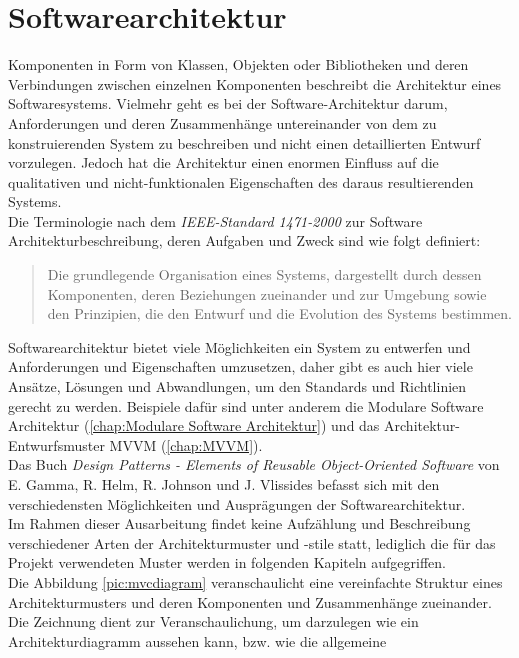 \section{Softwarearchitektur}
\label{chap:Softwarearchitektur}
Komponenten in Form von Klassen, Objekten oder Bibliotheken und deren Verbindungen zwischen einzelnen Komponenten beschreibt die Architektur 
eines Softwaresystems. Vielmehr geht es bei der Software-Architektur darum, Anforderungen und deren Zusammenhänge untereinander von dem zu 
konstruierenden System zu beschreiben und nicht einen detaillierten Entwurf vorzulegen. Jedoch hat die Architektur einen enormen Einfluss 
auf die qualitativen und nicht-funktionalen Eigenschaften des daraus resultierenden Systems. 
\\ 
\linebreak
Die Terminologie nach dem \textit{IEEE-Standard 1471-2000} zur Software Architekturbeschreibung, deren Aufgaben und Zweck \cite{swarchitekturieee.2005} 
sind wie folgt definiert: 
\begin{quote}
    Die grundlegende Organisation eines Systems, dargestellt durch dessen Komponenten, deren Beziehungen zueinander und zur Umgebung sowie den 
    Prinzipien, die den Entwurf und die Evolution des Systems bestimmen. \cite{architektursw.2006f}
\end{quote}
Softwarearchitektur bietet viele Möglichkeiten ein System zu entwerfen und Anforderungen und Eigenschaften umzusetzen, daher gibt es auch 
hier viele Ansätze, Lösungen und Abwandlungen, um den Standards und Richtlinien gerecht zu werden. Beispiele dafür sind unter anderem die 
Modulare Software Architektur (\ref{chap:Modulare Software Architektur}) und das Architektur-Entwurfsmuster MVVM (\ref{chap:MVVM}).
\\
Das Buch \textit{Design Patterns - Elements of Reusable Object-Oriented Software} von E. Gamma, R. Helm, R. Johnson und J. Vlissides befasst 
sich mit den verschiedensten Möglichkeiten und Ausprägungen der Softwarearchitektur. 
\\ 
Im Rahmen dieser Ausarbeitung findet keine Aufzählung und Beschreibung verschiedener Arten der Architekturmuster und -stile statt, lediglich die 
für das Projekt verwendeten Muster werden in folgenden Kapiteln aufgegriffen. 
\\ 
\linebreak
Die Abbildung \ref{pic:mvcdiagram} veranschaulicht eine vereinfachte Struktur eines Architekturmusters und deren Komponenten und Zusammenhänge 
zueinander. Die Zeichnung dient zur Veranschaulichung, um darzulegen wie ein Architekturdiagramm aussehen kann, bzw. wie die allgemeine 
